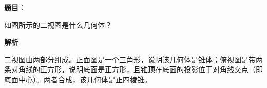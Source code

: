 \begin{answer}

\textbf{题目}：

如图所示的二视图是什么几何体？
\nopagebreak[4]
\begin{center}\end{center}
\nopagebreak[4]
\textbf{解析}

二视图由两部分组成。正面图是一个三角形，说明该几何体是锥体；俯视图是带两条对角线的正方形，说明底面是正方形，且锥顶在底面的投影位于对角线交点（即底面中心）。两者合成，该几何体是正四棱锥。
\nopagebreak[4]
\begin{center}\end{center}
\nopagebreak[4]

\end{answer}
